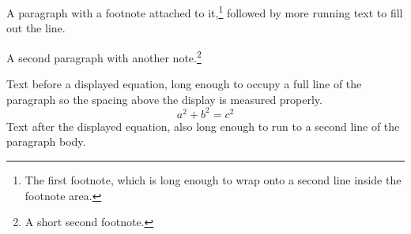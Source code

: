 \documentclass[a4paper,10pt]{article}
\begin{document}
A paragraph with a footnote attached to it,\footnote{The first footnote, which
is long enough to wrap onto a second line inside the footnote area.} followed
by more running text to fill out the line.

A second paragraph with another note.\footnote{A short second footnote.}

Text before a displayed equation, long enough to occupy a full line of the
paragraph so the spacing above the display is measured properly.
\[ a^2 + b^2 = c^2 \]
Text after the displayed equation, also long enough to run to a second line
of the paragraph body.
\end{document}
